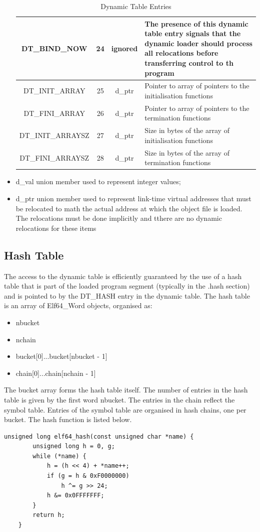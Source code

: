 \documentclass[paper=a4, fontsize=11pt]{report} %
\numberwithin{equation}{section} %
\numberwithin{figure}{section} %
\numberwithin{table}{section} %
\begin{document}
\begin{itemize}
\begin{table}[!htbp]
\begin{center}
\begin{tabular}{|c|c|c|p{10cm}|}
{\ttfamily DT\_BIND\_NOW} & 24 & {\ttfamily ignored} & The presence of this 
dynamic table entry signals that the dynamic loader should process all 
relocations before transferring control to th program\\ \hline
{\ttfamily DT\_INIT\_ARRAY} & 25 & {\ttfamily d\_ptr} & Pointer to array of 
pointers to the initialisation functions\\ \hline
{\ttfamily DT\_FINI\_ARRAY} & 26 & {\ttfamily d\_ptr} & Pointer to array of 
pointers to the termination functions\\ \hline
{\ttfamily DT\_INIT\_ARRAYSZ} & 27 & {\ttfamily d\_ptr} & Size in bytes of the 
array of initialisation functions\\ \hline
{\ttfamily DT\_FINI\_ARRAYSZ} & 28 & {\ttfamily d\_ptr} & Size in bytes of the 
array of termination functions\\ \hline
\end{tabular} \caption{Dynamic Table Entries} \end{center}
\end{table}
  \item {\ttfamily d\_val} union member used to represent integer values;
	\item {\ttfamily d\_ptr} union member used to represent link-time virtual 
	addresses that must be relocated to math the actual address at which the 
	object file is loaded. The relocations must be done implicitly and tthere 
	are no dynamic relocations for these items
\end{itemize} \newpage
\subsection{Hash Table}
The access to the dynamic table is efficiently guaranteed by the use of a hash 
table that is part of the loaded program segment (typically in the {\ttfamily 
.hash} section) and is pointed to by the {\ttfamily DT\_HASH} entry in the 
dynamic table. The hash table is an array of {\ttfamily Elf64\_Word} objects, 
organised as:
\begin{itemize}
	\item {\ttfamily nbucket}
	\item {\ttfamily nchain}
	\item {\ttfamily bucket[0]...bucket[nbucket - 1]}
	\item {\ttfamily chain[0]...chain[nchain - 1]}
\end{itemize}
The {\ttfamily bucket} array forms the hash table itself. The number of entries
in the hash table is given by the first word {\ttfamily nbucket}. The entries 
in the {\ttfamily chain} reflect the symbol table. Entries of the symbol table 
are organised in hash chains, one per bucket. The hash function is listed below.
\begin{lstlisting}[style=ansic, caption={Program Header}, label=hashtab]
    unsigned long elf64_hash(const unsigned char *name) {
        unsigned long h = 0, g;
        while (*name) {
            h = (h << 4) + *name++;
            if (g = h & 0xF0000000)
                h ^= g >> 24;
            h &= 0x0FFFFFFF;
        }
        return h;
    }
\end{lstlisting}
\end{document}
